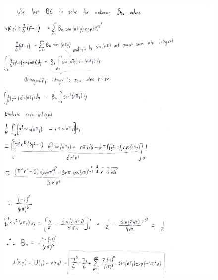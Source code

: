 \documentclass[10pt]{article}
\begin{document}
\begin{figure}[H]
	\begin{center}
		\includegraphics[width=16cm]{app2_p3.jpg}
	\end{center}
\end{figure}
\pagebreak
\end{document}
